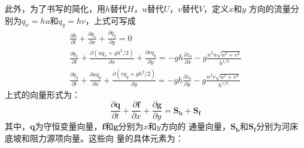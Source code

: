 此外，为了书写的简化，用$h$替代$H$，$u$替代$U$，$v$替代$V$，定义$x$和$y$
方向的流量分别为$q_{x}=hu$和$q_{y}=hv$，上式可写成
\begin{equation}
  \begin{gathered}
  \frac{\partial h}{\partial t} +
  \frac{\partial q_{x}}{\partial x} +
  \frac{\partial q_{y}}{\partial y}
  =
  0
    \\
  \frac{\partial q_{x}}{\partial t} +
  \frac{\partial (uq_{x}+gh^{2}/2)}{\partial x} +
  \frac{\partial vq_{y}}{\partial y} 
  =
  -gh\frac{\partial z_{b}}{\partial x}
  -g\frac{n^{2}u\sqrt{u^{2}+v^{2}}}{h^{1/3}}
    \\
  \frac{\partial q_{y}}{\partial t} +
  \frac{\partial uq_{y}}{\partial x} +
  \frac{\partial (vq_{y}+gh^{2}/2)}{\partial y} 
  =
  -gh\frac{\partial z_{b}}{\partial y}
  -g\frac{n^{2}v\sqrt{u^{2}+v^{2}}}{h^{1/3}}
  \end{gathered}
\end{equation}
上式的向量形式为：
\begin{equation}
  \frac{\partial \mathbf{q}}{\partial t} +
  \frac{\partial \mathbf{f}}{\partial x} +
  \frac{\partial \mathbf{g}}{\partial y}
  =
  \mathbf{S_{b}} + \mathbf{S_{f}}
\end{equation}
其中，$\mathbf{q}$为守恒变量向量，$\mathbf{f}$和$\mathbf{g}$分别为$x$和$y$方向的
通量向量，$\mathbf{S_{b}}$和$\mathbf{S_{f}}$分别为河床底坡和阻力源项向量。这些向
量的具体元素为：
